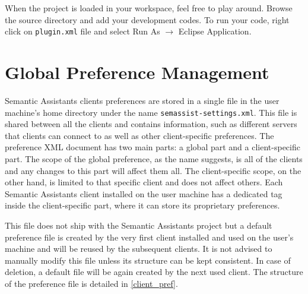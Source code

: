 When the project is loaded in your workspace, feel free to play around. Browse
the source directory and add your development codes. To run your code, right
click on \texttt{plugin.xml} file and select Run As $\rightarrow$ Eclipse
Application.

\section{Global Preference Management}
\label{sec:pref_management}
Semantic Assistants clients preferences are stored in a single file in the user machine's home directory under the name \texttt{semassist-settings.xml}. This file is shared between all the clients and contains information, such as different servers that clients can connect to as well as other client-specific preferences. The preference XML document has two main parts: a global part and a client-specific part. The scope of the global preference, as the name suggests, is all of the clients and any changes to this part will affect them all. The client-specific scope, on the other hand, is limited to that specific client and does not affect others. Each Semantic Assistants client installed on the user machine has a dedicated tag inside the client-specific part, where it can store its proprietary preferences.

This file does not ship with the Semantic Assistants project but a default preference file is created by the very first client installed and used on the user's machine and will be reused by the subsequent clients. It is not advised to manually modify this file unless its structure can be kept consistent. In case of deletion, a default file will be again created by the next used client. The structure of the preference file is detailed in \ref{client_pref}.